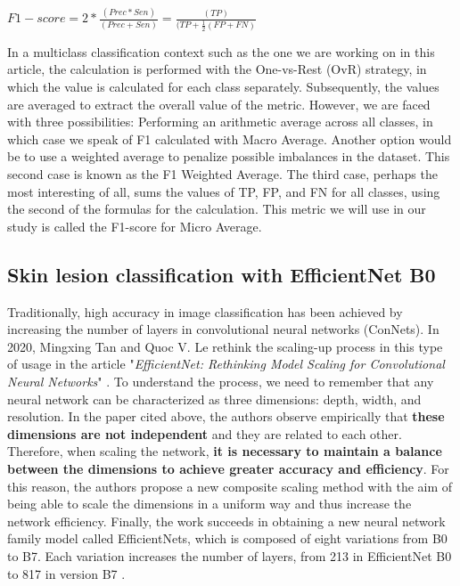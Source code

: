 \begin{enumerate}
    \hspace{3cm} $F1-score = 2 * \frac{(Prec * Sen)}{(Prec + Sen)} = \frac{(TP)}{(TP + \frac{1}{2}(FP + FN)}$

    In a multiclass classification context such as the one we are working on in this article, the calculation is performed with the One-vs-Rest (OvR) strategy, in which the value is calculated for each class separately. Subsequently, the values are averaged to extract the overall value of the metric. However, we are faced with three possibilities: Performing an arithmetic average across all classes, in which case we speak of F1 calculated with Macro Average. Another option would be to use a weighted average to penalize possible imbalances in the dataset. This second case is known as the F1 Weighted Average. The third case, perhaps the most interesting of all, sums the values of TP, FP, and FN for all classes, using the second of the formulas for the calculation. This metric we will use in our study is called the F1-score for Micro Average.
    
    
\end{enumerate}
    


\subsection{Skin lesion classification with EfficientNet B0}
Traditionally, high accuracy in image classification has been achieved by increasing the number of layers in convolutional neural networks (ConNets). In 2020, Mingxing Tan and Quoc V. Le rethink the scaling-up process in this type of usage in the article "\textit{EfficientNet: Rethinking Model Scaling for Convolutional Neural Networks}" \cite{tan_efficientnet_2020}. To understand the process, we need to remember that any neural network can be characterized as three dimensions: depth, width, and resolution. In the paper cited above, the authors observe empirically that \textbf{these dimensions are not independent} and they are related to each other. Therefore, when scaling the network, \textbf{it is necessary to maintain a balance between the dimensions to achieve greater accuracy and efficiency}. For this reason, the authors propose a new composite scaling method with the aim of being able to scale the dimensions in a uniform way and thus increase the network efficiency. Finally, the work succeeds in obtaining a new neural network family model called EfficientNets, which is composed of eight variations from B0 to B7. Each variation increases the number of layers, from 213 in EfficientNet B0 to 817 in version B7 \cite{medium_EfficientNet}. 

